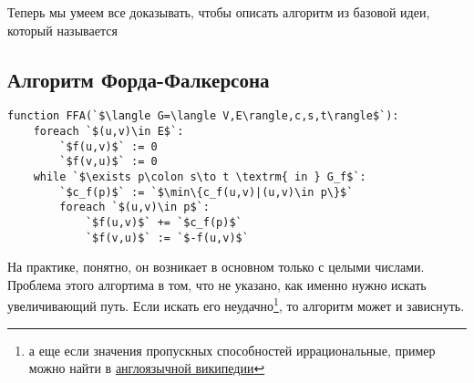 Теперь мы умеем все доказывать, чтобы описать алгоритм из базовой идеи, который называется
\subsection{Алгоритм Форда-Фалкерсона}
\begin{lstlisting}[escapeinside=``]
function FFA(`$\langle G=\langle V,E\rangle,c,s,t\rangle$`):
	foreach `$(u,v)\in E$`:
		`$f(u,v)$` := 0
		`$f(v,u)$` := 0
	while `$\exists p\colon s\to t \textrm{ in } G_f$`:
		`$c_f(p)$` := `$\min\{c_f(u,v)|(u,v)\in p\}$`
		foreach `$(u,v)\in p$`:
			`$f(u,v)$` += `$c_f(p)$`
			`$f(v,u)$` := `$-f(u,v)$`
\end{lstlisting}

На практике, понятно, он возникает в основном только с целыми числами. Проблема этого алгортима в том, что не указано, как именно нужно искать увеличивающий путь. Если искать его неудачно\footnote{а еще если значения пропускных способностей иррациональные, пример можно найти в \href{https://en.wikipedia.org/wiki/Ford-Fulkerson_algorithm}{англоязычной википедии}}, то алгоритм может и зависнуть.

